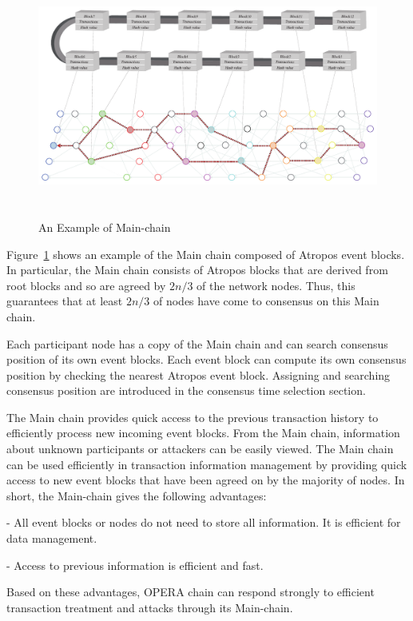 \documentclass{article}
\begin{document}
\begin{figure} \centering  
\includegraphics[height=8cm, width=1.0\columnwidth]{Mainchain.pdf}
\caption{An Example of Main-chain}
\label{fig:mainchain}
\end{figure}

Figure~\ref{fig:mainchain} shows an example of the Main chain composed of Atropos event blocks. 
In particular, the Main chain consists of Atropos blocks that are derived from root blocks and so are agreed by $2n/3$ of the network nodes. Thus, this guarantees that at least $2n/3$ of nodes have come to consensus on this Main chain. 

Each participant node has a copy of the Main chain and can search consensus position of its own event blocks.
Each event block can compute its own consensus position by checking the nearest Atropos event block. Assigning and searching consensus position are introduced in the consensus time selection section. 

The Main chain provides quick access to the previous transaction history to efficiently process new incoming event blocks. From the Main chain, information about unknown participants or attackers can be easily viewed.
The Main chain can be used efficiently in transaction information management by providing quick access to new event blocks that have been agreed on by the majority of nodes. In short, the Main-chain gives the following advantages:

-	All event blocks or nodes do not need to store all information. It is efficient for data management.

-	Access to previous information is efficient and fast.

Based on these advantages, OPERA chain can respond strongly to efficient transaction treatment and attacks through its Main-chain.
\end{document}
